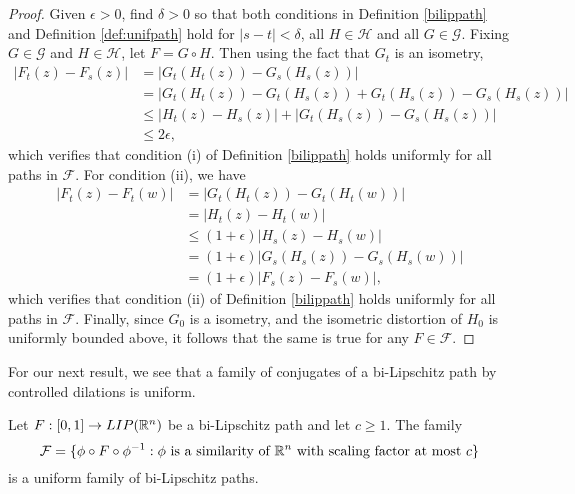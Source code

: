 \documentclass{amsart}
\begin{document}
\begin{proof}
Given $\epsilon >0$, find $\delta >0$ so that both conditions in Definition \ref{bilippath} and Definition \ref{def:unifpath} hold for $|s-t| <\delta$, all $H\in \mathcal{H}$ and all $G \in \mathcal{G}$. Fixing $G \in \mathcal{G}$ and $H \in \mathcal{H}$, let $F  = G\circ H$. Then using the fact that $G_t$ is an isometry,
\begin{align*}
| F_t(z) - F_s(z) | &= |G_t(H_t(z)) - G_s(H_s(z)) | \\
&= | G_t(H_t(z)) - G_t(H_s(z)) + G_t(H_s(z)) - G_s(H_s(z)) | \\
&\leq | H_t(z) - H_s(z) | + |G_t(H_s(z)) -G_s(H_s(z)) | \\
& \leq 2 \epsilon,
\end{align*}
which verifies that condition (i) of Definition \ref{bilippath} holds uniformly for all paths in $\mathcal{F}$. For condition (ii), we have
\begin{align*}
|F_t(z) - F_t(w)| &= |G_t(H_t(z)) - G_t(H_t(w))| \\
&= |H_t(z) -H_t(w)| \\
& \leq (1+\epsilon) |H_s(z) - H_s(w)| \\
&= (1+\epsilon) |G_s(H_s(z)) - G_s(H_s(w))| \\
&= (1+\epsilon) |F_s(z) -F_s(w)|,
\end{align*}
which verifies that condition (ii) of Definition \ref{bilippath} holds uniformly for all paths in $\mathcal{F}$. Finally, since $G_0$ is a isometry,
and the isometric distortion of $H_0$ is uniformly bounded above, it follows that the same is true for any $F \in \mathcal{F}$.
\end{proof}

For our next result, we see that a family of conjugates of a bi-Lipschitz path by controlled dilations is uniform.

\begin{lemma}
\label{lem:pathdil}
Let $F:[0,1] \to LIP(\mathbb{R}^n)$ be a bi-Lipschitz path and let $c\geq 1$. The family 
\[\mathcal{F} = \{ \phi\circ F \circ \phi^{-1}  : \text{$\phi$ is a similarity of $\mathbb{R}^n$ with scaling factor at most $c$}\}\] 
is a uniform family of bi-Lipschitz paths.
\end{lemma}
\end{document}
